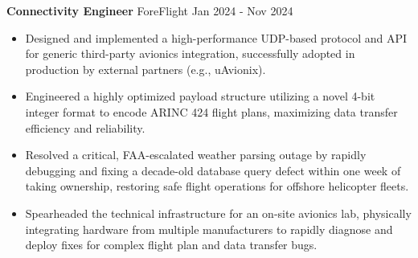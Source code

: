 \textbf{Connectivity Engineer} ForeFlight \hfill Jan 2024 - Nov 2024

\begin{itemize} \itemsep -2pt

\item Designed and implemented a high-performance UDP-based protocol and API for generic third-party avionics integration, successfully adopted in production by external partners (e.g., uAvionix).

\item Engineered a highly optimized payload structure utilizing a novel 4-bit integer format to encode ARINC 424 flight plans, maximizing data transfer efficiency and reliability.

\item Resolved a critical, FAA-escalated weather parsing outage by rapidly debugging and fixing a decade-old database query defect within one week of taking ownership, restoring safe flight operations for offshore helicopter fleets.    

\item Spearheaded the technical infrastructure for an on-site avionics lab, physically integrating hardware from multiple manufacturers to rapidly diagnose and deploy fixes for complex flight plan and data transfer bugs.

\end{itemize}

